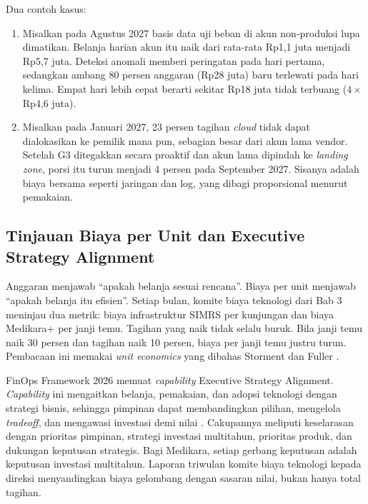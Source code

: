 Dua contoh kasus:
\begin{enumerate}
  \item Misalkan pada Agustus 2027 basis data uji beban di akun non-produksi lupa dimatikan.
        Belanja harian akun itu naik dari rata-rata Rp1,1 juta menjadi Rp5,7 juta. Deteksi anomali
        memberi peringatan pada hari pertama, sedangkan ambang 80 persen anggaran (Rp28 juta) baru
        terlewati pada hari kelima. Empat hari lebih cepat berarti sekitar Rp18 juta tidak terbuang
        ($4 \times$ Rp4,6 juta).
  \item Misalkan pada Januari 2027, 23 persen tagihan \textit{cloud} tidak dapat dialokasikan ke
        pemilik mana pun, sebagian besar dari akun lama vendor. Setelah G3 ditegakkan secara
        proaktif dan akun lama dipindah ke \textit{landing zone}, porsi itu turun menjadi 4 persen
        pada September 2027. Sisanya adalah biaya bersama seperti jaringan dan log, yang dibagi
        proporsional menurut pemakaian.
\end{enumerate}

\subsection{Tinjauan Biaya per Unit dan Executive Strategy Alignment}

Anggaran menjawab ``apakah belanja sesuai rencana''. Biaya per unit menjawab ``apakah belanja itu
efisien''. Setiap bulan, komite biaya teknologi dari Bab 3 meninjau dua metrik: biaya infrastruktur
SIMRS per kunjungan dan biaya Medikara+ per janji temu. Tagihan yang naik tidak selalu buruk. Bila
janji temu naik 30 persen dan tagihan naik 10 persen, biaya per janji temu justru turun. Pembacaan
ini memakai \textit{unit economics} yang dibahas Storment dan Fuller \cite{storment2023}.

FinOps Framework 2026 memuat \textit{capability} Executive Strategy Alignment. \textit{Capability}
ini mengaitkan belanja, pemakaian, dan adopsi teknologi dengan strategi bisnis, sehingga pimpinan
dapat membandingkan pilihan, mengelola \textit{tradeoff}, dan mengawasi investasi demi nilai
\cite{c14-finops-esa}. Cakupannya meliputi keselarasan dengan prioritas pimpinan, strategi investasi
multitahun, prioritas produk, dan dukungan keputusan strategis. Bagi Medikara, setiap gerbang
keputusan adalah keputusan investasi multitahun. Laporan triwulan komite biaya teknologi kepada
direksi menyandingkan biaya gelombang dengan sasaran nilai, bukan hanya total tagihan.

